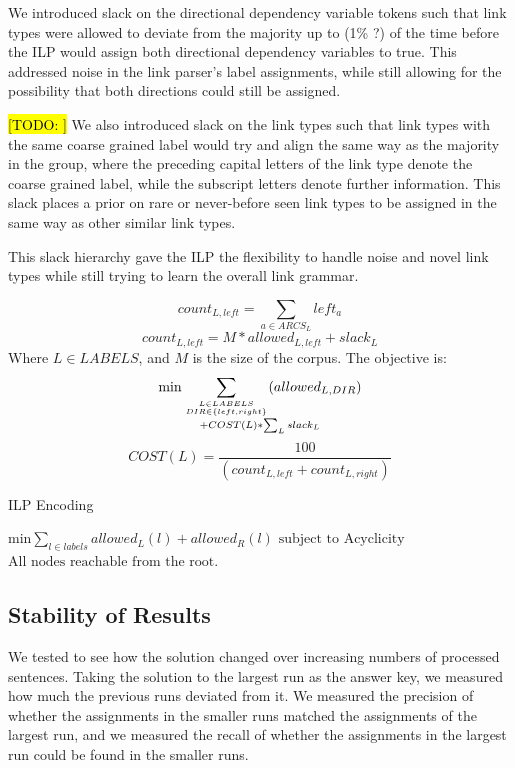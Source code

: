 \documentclass[11pt]{article}
\newcommand{\Note}[1]{}
\renewcommand{\Note}[1]{\hl{[#1]}}  %
\newcommand{\TODO}[1]{\Note{TODO: #1}}
\begin{document}
We introduced slack on the directional dependency variable tokens such that link types were allowed to deviate from the majority up to (1\% ?) of the time before the ILP would assign both directional dependency variables to true. This addressed noise in the link parser's label assignments, while still allowing for the possibility that both directions could still be assigned.

\TODO{} We also introduced slack on the link types such that link types with the same coarse grained label would try and align the same way as the majority in the group, where the preceding capital letters of the link type denote the coarse grained label, while the subscript letters denote further information. This slack places a prior on rare or never-before seen link types to be assigned in the same way as other similar link types.

This slack hierarchy gave the ILP the flexibility to handle noise and novel link types while still trying to learn the overall link grammar.


\begin{equation}
  count_{L, left} = \sum_{a \in ARCS_L} left_a
\end{equation}
\begin{equation}
  count_{L, left} = M * allowed_{L,left} + slack_{L}
\end{equation}
Where $L \in LABELS$, and $M$ is the size of the corpus.
The objective is:
\begin{equation}
  \min \sum_{L \in LABELS \atop DIR \in \{left, right\}} (allowed_{L,DIR}) \atop + COST(L) * \sum_L slack_L
\end{equation}
\begin{equation}
  COST(L) = \frac{100}{(count_{L,left} + count_{L,right})}
\end{equation}


\begin{algorithm}
\caption{ILP Encoding}\label{ILP}
\begin{algorithmic}[1]

\State $\text{min} \sum_{l \in labels} allowed_L(l) + allowed_R(l)$
\State $\text{subject to}$
\State $\text{Acyclicity}$
\State $\text{All nodes reachable from the root.}$

\end{algorithmic}
\end{algorithm}



\subsection{Stability of Results}
We tested to see how the solution changed over increasing numbers of processed sentences. 
Taking the solution to the largest run as the answer key, we measured how much the previous runs deviated from it. We measured the precision of whether the assignments in the smaller runs matched the assignments of the largest run, and we measured the recall of whether the assignments in the largest run could be found in the smaller runs. 
\end{document}
